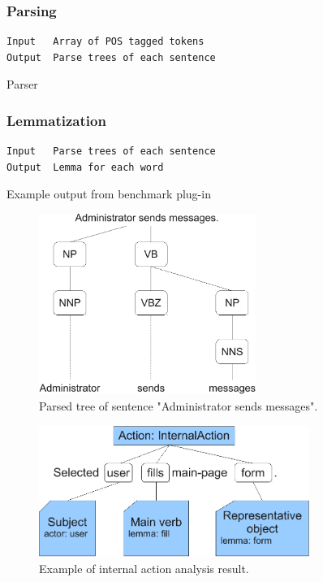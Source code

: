 \subsubsection{Parsing}

\begin{table}[ht]   %
\begin{center}
    \begin{verbatim}
Input 	Array of POS tagged tokens
Output 	Parse trees of each sentence 
        \end{verbatim}
  \caption{Parser}
  \label{tab.parsing}
\end{center}
\end{table}  

\subsubsection{Lemmatization}
\begin{table}[ht]   %
\begin{center}
    \begin{verbatim}
Input 	Parse trees of each sentence
Output 	Lemma for each word 
        \end{verbatim}
  \caption{Example output from benchmark plug-in}
  \label{tab.parsing}
\end{center}
\end{table} 

\begin{figure}[ht]
  \centering
  \includegraphics[width=200pt]{images/ParsedTree}
  \caption{Parsed tree of sentence "Administrator sends messages".}
  \label{fig:ParsedTree}
\end{figure}

\begin{figure}[ht]
  \centering
  \includegraphics[width=250pt]{images/InternalActionExample}
  \caption{Example of internal action analysis result.}
  \label{fig:InternalActionExample}
\end{figure}

